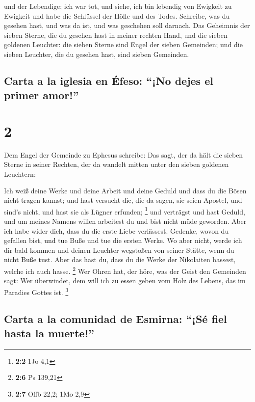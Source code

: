  und der Lebendige; ich war tot, und siehe, ich bin
lebendig von Ewigkeit zu Ewigkeit und habe die Schlüssel der Hölle und
des Todes.  Schreibe, was du gesehen hast, und was da
ist, und was geschehen soll darnach.  Das Geheimnis der
sieben Sterne, die du gesehen hast in meiner rechten Hand, und die
sieben goldenen Leuchter: die sieben Sterne sind Engel der sieben
Gemeinden; und die sieben Leuchter, die du gesehen hast, sind sieben
Gemeinden.

\hypertarget{carta-a-la-iglesia-en-uxe9feso-no-dejes-el-primer-amor}{%
\subsection{Carta a la iglesia en Éfeso: ``¡No dejes el primer
amor!''}\label{carta-a-la-iglesia-en-uxe9feso-no-dejes-el-primer-amor}}

\hypertarget{section-1}{%
\section{2}\label{section-1}}

 Dem Engel der Gemeinde zu Ephesus schreibe: Das sagt, der
da hält die sieben Sterne in seiner Rechten, der da wandelt mitten unter
den sieben goldenen Leuchtern:

 Ich weiß deine Werke und deine Arbeit und deine Geduld
und dass du die Bösen nicht tragen kannst; und hast versucht die, die da
sagen, sie seien Apostel, und sind's nicht, und hast sie als Lügner
erfunden; \footnote{\textbf{2:2} 1Jo 4,1}  und verträgst
und hast Geduld, und um meines Namens willen arbeitest du und bist nicht
müde geworden.  Aber ich habe wider dich, dass du die
erste Liebe verlässest.  Gedenke, wovon du gefallen bist,
und tue Buße und tue die ersten Werke. Wo aber nicht, werde ich dir bald
kommen und deinen Leuchter wegstoßen von seiner Stätte, wenn du nicht
Buße tust.  Aber das hast du, dass du die Werke der
Nikolaiten hassest, welche ich auch hasse. \footnote{\textbf{2:6} Ps
  139,21}  Wer Ohren hat, der höre, was der Geist den
Gemeinden sagt: Wer überwindet, dem will ich zu essen geben vom Holz des
Lebens, das im Paradies Gottes ist. \footnote{\textbf{2:7} Offb 22,2;
  1Mo 2,9}

\hypertarget{carta-a-la-comunidad-de-esmirna-suxe9-fiel-hasta-la-muerte}{%
\subsection{Carta a la comunidad de Esmirna: ``¡Sé fiel hasta la
muerte!''}\label{carta-a-la-comunidad-de-esmirna-suxe9-fiel-hasta-la-muerte}}

